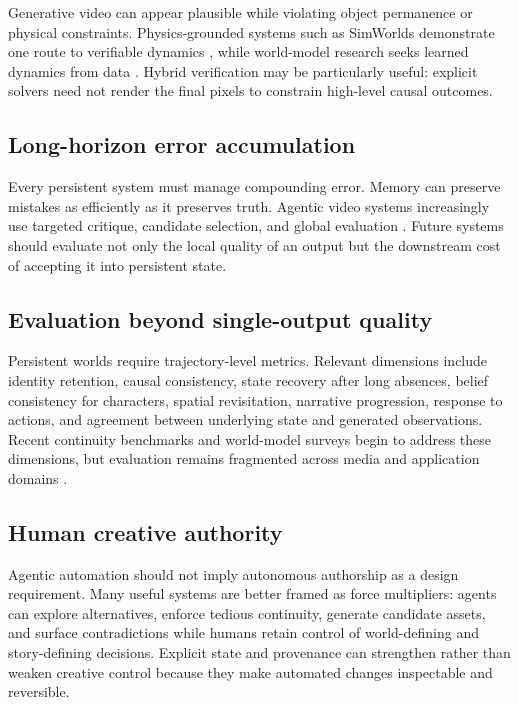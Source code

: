 \documentclass{article}
\begin{document}
Generative video can appear plausible while violating object permanence or physical constraints. Physics-grounded systems such as SimWorlds demonstrate one route to verifiable dynamics \citep{liu2026simworlds}, while world-model research seeks learned dynamics from data \citep{li2025worldmodelsurvey}. Hybrid verification may be particularly useful: explicit solvers need not render the final pixels to constrain high-level causal outcomes.

\subsection{Long-horizon error accumulation}

Every persistent system must manage compounding error. Memory can preserve mistakes as efficiently as it preserves truth. Agentic video systems increasingly use targeted critique, candidate selection, and global evaluation \citep{shi2025animaker,song2026vqqa,chen2026cinecrew}. Future systems should evaluate not only the local quality of an output but the downstream cost of accepting it into persistent state.

\subsection{Evaluation beyond single-output quality}

Persistent worlds require trajectory-level metrics. Relevant dimensions include identity retention, causal consistency, state recovery after long absences, belief consistency for characters, spatial revisitation, narrative progression, response to actions, and agreement between underlying state and generated observations. Recent continuity benchmarks and world-model surveys begin to address these dimensions, but evaluation remains fragmented across media and application domains \citep{mondal2026canvas,long2026a2rd,li2026pixelstostates}.

\subsection{Human creative authority}

Agentic automation should not imply autonomous authorship as a design requirement. Many useful systems are better framed as force multipliers: agents can explore alternatives, enforce tedious continuity, generate candidate assets, and surface contradictions while humans retain control of world-defining and story-defining decisions. Explicit state and provenance can strengthen rather than weaken creative control because they make automated changes inspectable and reversible.
\end{document}

